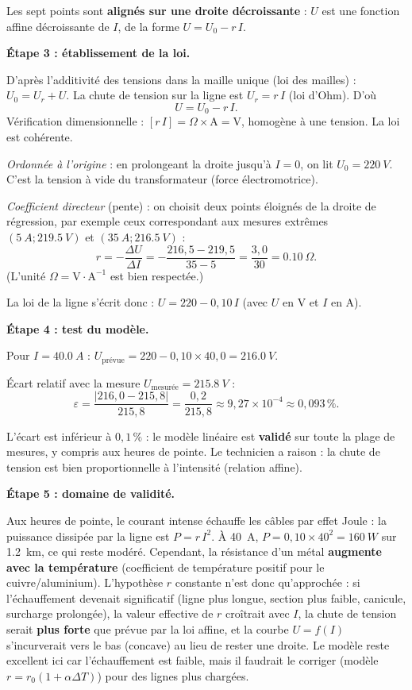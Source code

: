 \documentclass[11pt]{article}
\begin{document}
\begin{exoresolu}
Les sept points sont \textbf{alignés sur une droite décroissante} : $U$ est une fonction affine décroissante de $I$, de la forme $U = U_0 - r\,I$.

\textbf{Étape 3 : établissement de la loi.}

D'après l'additivité des tensions dans la maille unique (loi des mailles) : $U_0 = U_r + U$. La chute de tension sur la ligne est $U_r = r\,I$ (loi d'Ohm). D'où
\[ U = U_0 - r\,I. \]
Vérification dimensionnelle : $[r\,I] = \Omega \times \text{A} = \text{V}$, homogène à une tension. La loi est cohérente.

\emph{Ordonnée à l'origine} : en prolongeant la droite jusqu'à $I = 0$, on lit $U_0 = \SI{220}{V}$. C'est la tension à vide du transformateur (force électromotrice).

\emph{Coefficient directeur} (pente) : on choisit deux points éloignés de la droite de régression, par exemple ceux correspondant aux mesures extrêmes $(\SI{5}{A} ; \SI{219,5}{V})$ et $(\SI{35}{A} ; \SI{216,5}{V})$ :
\[ r = -\frac{\Delta U}{\Delta I} = -\frac{216,5 - 219,5}{35 - 5} = \frac{3,0}{30} = \SI{0,10}{\Omega}. \]
(L'unité $\Omega = \text{V}\cdot\text{A}^{-1}$ est bien respectée.)

La loi de la ligne s'écrit donc : $\boxed{U = 220 - 0,10\,I}$ (avec $U$ en V et $I$ en A).

\textbf{Étape 4 : test du modèle.}

Pour $I = \SI{40,0}{A}$ : $U_{\text{prévue}} = 220 - 0,10 \times 40,0 = \SI{216,0}{V}$.

Écart relatif avec la mesure $U_{\text{mesurée}} = \SI{215,8}{V}$ :
\[ \varepsilon = \frac{|216,0 - 215,8|}{215,8} = \frac{0,2}{215,8} \approx 9,27 \times 10^{-4} \approx 0,093\,\%. \]

L'écart est inférieur à $0,1\,\%$ : le modèle linéaire est \textbf{validé} sur toute la plage de mesures, y compris aux heures de pointe. Le technicien a raison : la chute de tension est bien proportionnelle à l'intensité (relation affine).

\textbf{Étape 5 : domaine de validité.}

Aux heures de pointe, le courant intense échauffe les câbles par effet Joule : la puissance dissipée par la ligne est $P = r\,I^2$. À \SI{40}{A}, $P = 0,10 \times 40^2 = \SI{160}{W}$ sur \SI{1,2}{km}, ce qui reste modéré. Cependant, la résistance d'un métal \textbf{augmente avec la température} (coefficient de température positif pour le cuivre/aluminium). L'hypothèse \og $r$ constante \fg{} n'est donc qu'approchée : si l'échauffement devenait significatif (ligne plus longue, section plus faible, canicule, surcharge prolongée), la valeur effective de $r$ croîtrait avec $I$, la chute de tension serait \textbf{plus forte} que prévue par la loi affine, et la courbe $U = f(I)$ s'incurverait vers le bas (concave) au lieu de rester une droite. Le modèle reste excellent ici car l'échauffement est faible, mais il faudrait le corriger (modèle $r = r_0(1 + \alpha \Delta T)$) pour des lignes plus chargées.


\end{exoresolu}
\end{document}
